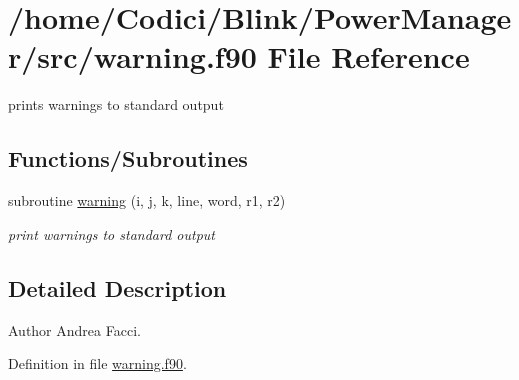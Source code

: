 \hypertarget{warning_8f90}{\section{/home/\-Codici/\-Blink/\-Power\-Manager/src/warning.f90 File Reference}
\label{warning_8f90}
}


prints warnings to standard output  


\subsection*{Functions/\-Subroutines}
\begin{DoxyCompactItemize}
\item 
subroutine \hyperlink{warning_8f90_ad7335e6f906b46bf4211928111c616fd}{warning} (i, j, k, line, word, r1, r2)
\begin{DoxyCompactList}\small\item\em print warnings to standard output \end{DoxyCompactList}\end{DoxyCompactItemize}


\subsection{Detailed Description}
\begin{DoxyAuthor}{Author}
Andrea Facci. 
\end{DoxyAuthor}


Definition in file \hyperlink{warning_8f90_source}{warning.\-f90}.



